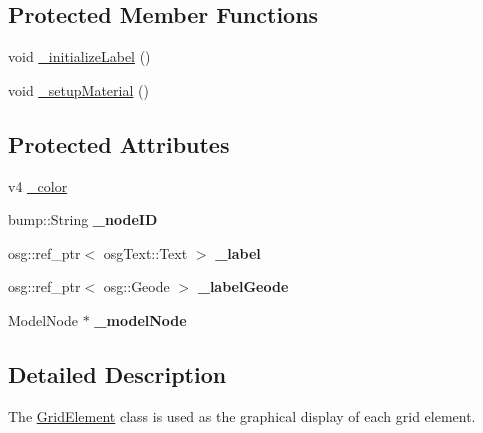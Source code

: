 \subsection*{Protected Member Functions}
\begin{DoxyCompactItemize}
\item 
void \hyperlink{class_grid_element_af853d66404412c70cd56c39969ab2564}{\_\-initializeLabel} ()
\item 
void \hyperlink{class_grid_element_ab9c419150dfaca5b2947da452edd558e}{\_\-setupMaterial} ()
\end{DoxyCompactItemize}
\subsection*{Protected Attributes}
\begin{DoxyCompactItemize}
\item 
v4 \hyperlink{class_grid_element_a071f85c15b3a75f56d9537f94ed354c8}{\_\-color}
\item 
\hypertarget{class_grid_element_a16821662d3c13958cee02e9df74e64d2}{
bump::String {\bfseries \_\-nodeID}}
\label{class_grid_element_a16821662d3c13958cee02e9df74e64d2}

\item 
\hypertarget{class_grid_element_acde398075dde1c50415f380fb8314796}{
osg::ref\_\-ptr$<$ osgText::Text $>$ {\bfseries \_\-label}}
\label{class_grid_element_acde398075dde1c50415f380fb8314796}

\item 
\hypertarget{class_grid_element_aea1862c2293ed7fc943916dd969f90ad}{
osg::ref\_\-ptr$<$ osg::Geode $>$ {\bfseries \_\-labelGeode}}
\label{class_grid_element_aea1862c2293ed7fc943916dd969f90ad}

\item 
\hypertarget{class_grid_element_a8fb3e20f47572d113ad496c89ec4004b}{
ModelNode $\ast$ {\bfseries \_\-modelNode}}
\label{class_grid_element_a8fb3e20f47572d113ad496c89ec4004b}

\end{DoxyCompactItemize}


\subsection{Detailed Description}
The \hyperlink{class_grid_element}{GridElement} class is used as the graphical display of each grid element. 

